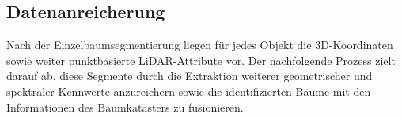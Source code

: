 \subsection{Datenanreicherung}

Nach der Einzelbaumsegmentierung liegen für jedes Objekt die 3D-Koordinaten sowie weiter punktbasierte LiDAR-Attribute vor. Der nachfolgende Prozess zielt darauf ab, diese Segmente durch die Extraktion weiterer geometrischer und spektraler Kennwerte anzureichern sowie die identifizierten Bäume mit den Informationen des Baumkatasters zu fusionieren.